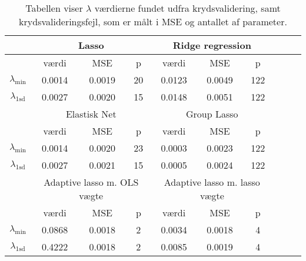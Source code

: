 \begin{table}
\center
\begin{tabular}{cccc | cccccc}
\toprule
 &  \multicolumn{3}{c}{Lasso} &  \multicolumn{3}{c}{Ridge regression}  \\ \midrule
 & værdi & MSE & p & 	værdi & MSE & p \\
 $\lambda_{\min}$ &0.0014& 0.0019 & 20 	& 0.0123 &  0.0049 & 122 \\ 
 $\lambda_{1 \text{sd}}$ & 0.0027 & 0.0020 & 15 & 0.0148 & 0.0051 & 122  \\ \bottomrule \toprule
  &  \multicolumn{3}{c}{Elastisk Net}  &  \multicolumn{3}{c}{Group Lasso}  \\ \midrule
 & værdi & MSE & p & værdi & MSE & p \\
 $\lambda_{\min}$ & 0.0014 & 0.0020 & 23 & 0.0003 & 0.0023  & 122\\
  $\lambda_{1\text{sd}}$ & 0.0027 & 0.0021 & 15 & 0.0005 & 0.0024 & 122 \\  \bottomrule \toprule
 &  \multicolumn{3}{c}{Adaptive lasso m. OLS vægte}  &  \multicolumn{3}{c}{Adaptive lasso m. lasso vægte}  \\ \midrule
  & værdi & MSE & p & værdi & MSE & p \\
 $\lambda_{\min}$  & 0.0868 & 0.0018 & 2 & 0.0034 & 0.0018 & 4   \\
 $\lambda_{1\text{sd}}$ & 0.4222 & 0.0018 & 2 & 0.0085 & 0.0019 & 4  \\ \bottomrule
 \end{tabular}
\caption{Tabellen viser $\lambda$ værdierne fundet udfra krydsvalidering, samt krydsvalideringsfejl, som er målt i MSE og antallet af parameter.} \label{tab:cv_tab}
\end{table}
